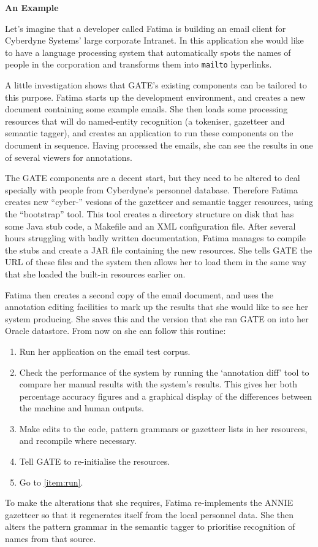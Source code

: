 {\bf An Example}

Let's imagine that a developer called Fatima is building an email
client for Cyberdyne Systems' large corporate Intranet.
In this application she would like to have a language processing system
that automatically spots the names of people in the corporation and
transforms them into {\tt mailto} hyperlinks.

A little investigation shows that GATE's existing components can be tailored
to this purpose. Fatima starts up the development environment,
and creates a new document containing some example emails. She then
loads some processing resources that will do named-entity recognition (a
tokeniser, gazetteer and semantic tagger), and creates an application to run
these components on the document in sequence. Having processed the emails,
she can see the results in one of several viewers for annotations.

The GATE components are a decent start, but they need to be altered to deal
specially with people from Cyberdyne's personnel database. Therefore Fatima
creates new ``cyber-'' vesions of the gazetteer and semantic tagger resources,
using the ``bootstrap'' tool. This tool creates a directory structure on disk
that has some Java stub code, a Makefile and an XML configuration file.
After several hours struggling with badly written documentation, Fatima manages
to compile the stubs and create a JAR file containing the new resources. She
tells GATE the URL of these files and the
system then allows her to load them in the same way that she loaded the
built-in resources earlier on.

Fatima then creates a second copy of the email document, and uses the
annotation editing facilities to mark up the results that she would like to
see her system producing. She saves this and the version that she ran GATE on
into her Oracle datastore. From now on she can follow this routine:
%
\begin{enumerate}
\item\label{item:run}
Run her application on the email test corpus.
\item
Check the performance of the system by running the `annotation diff' tool to
compare her manual results with the system's results. This gives her both
percentage accuracy figures and a graphical display of the differences
between the machine and human outputs.
\item
Make edits to the code, pattern grammars or gazetteer lists in her resources,
and recompile where necessary.
\item
Tell GATE to re-initialise the resources.
\item
Go to \ref{item:run}.
\end{enumerate}
%
To make the alterations that she requires, Fatima re-implements the ANNIE
gazetteer so that it regenerates itself from the local personnel data.
She then alters the pattern grammar in the semantic tagger to prioritise
recognition of names from that source. 


